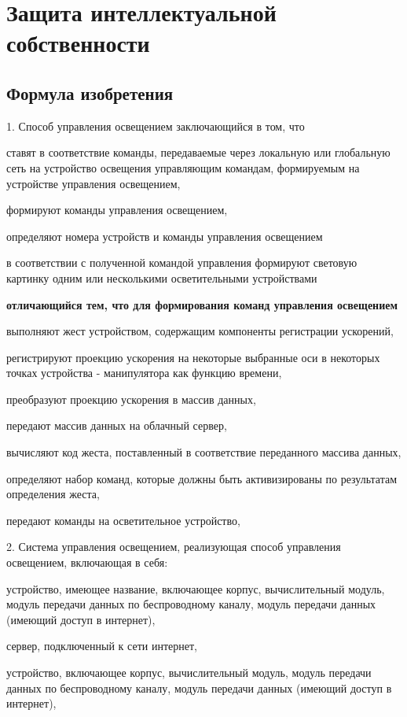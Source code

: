 \chapter{Защита интеллектуальной собственности}
 \section{Формула изобретения}
 
1. Способ управления освещением заключающийся в том, что 

ставят в соответствие команды, передаваемые через локальную или глобальную сеть на устройство освещения управляющим командам, формируемым на устройстве управления освещением, 

формируют команды управления освещением,

определяют номера устройств и команды управления освещением

в соответствии с полученной командой управления формируют световую картинку одним или несколькими осветительными устройствами 

\textbf{отличающийся тем, что для формирования команд управления освещением }

выполняют жест устройством, содержащим компоненты регистрации ускорений,

регистрируют проекцию ускорения на некоторые выбранные оси в некоторых точках устройства - манипулятора как функцию времени,

преобразуют проекцию ускорения в массив данных, 

передают массив данных на облачный сервер,

вычисляют код жеста, поставленный в соответствие переданного массива данных,

определяют набор команд, которые должны быть активизированы по результатам определения жеста,

передают команды на осветительное устройство, 


 
 
2. Система управления освещением, реализующая способ управления освещением, включающая в себя:


устройство, имеющее название, включающее корпус, вычислительный модуль, модуль передачи данных по беспроводному каналу, модуль передачи данных (имеющий доступ в интернет),   

сервер, подключенный к сети интернет,

устройство, включающее корпус, вычислительный модуль, модуль передачи данных по беспроводному каналу, модуль передачи данных  (имеющий доступ в интернет),  

